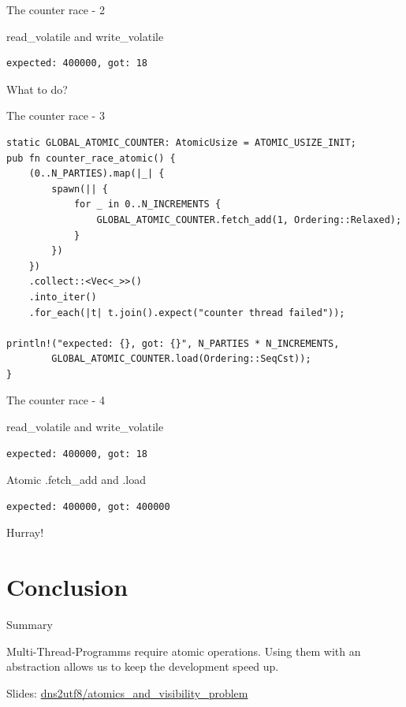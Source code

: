 \documentclass[10pt,aspectratio=169]{beamer}
\begin{document}
\begin{frame}[fragile]{The counter race - 2}

      \begin{alertblock}{read\_volatile and write\_volatile}
\begin{verbatim}
expected: 400000, got: 18
\end{verbatim}
      \end{alertblock}

    What to do?
\end{frame}


\begin{frame}[fragile]{The counter race - 3}
\begin{verbatim}
static GLOBAL_ATOMIC_COUNTER: AtomicUsize = ATOMIC_USIZE_INIT;
pub fn counter_race_atomic() {
    (0..N_PARTIES).map(|_| {
        spawn(|| {
            for _ in 0..N_INCREMENTS {
                GLOBAL_ATOMIC_COUNTER.fetch_add(1, Ordering::Relaxed);
            }
        })
    })
    .collect::<Vec<_>>()
    .into_iter()
    .for_each(|t| t.join().expect("counter thread failed"));

println!("expected: {}, got: {}", N_PARTIES * N_INCREMENTS,
        GLOBAL_ATOMIC_COUNTER.load(Ordering::SeqCst));
}
\end{verbatim}
\end{frame}


\begin{frame}[fragile]{The counter race - 4}

      \begin{block}{read\_volatile and write\_volatile}
\begin{verbatim}
expected: 400000, got: 18
\end{verbatim}
      \end{block}

      \begin{alertblock}{Atomic .fetch\_add and .load}
\begin{verbatim}
expected: 400000, got: 400000
\end{verbatim}
      \end{alertblock}

    Hurray!
\end{frame}


\section{Conclusion}

\begin{frame}{Summary}

  Multi-Thread-Programms require atomic operations.
  Using them with an abstraction allows us to keep the development speed up.

  \begin{center}Slides: \href{https://github.com/dns2utf8/atomics_and_visibility_problem}{dns2utf8/atomics\_and\_visibility\_problem}\end{center}


\end{frame}
\end{document}
